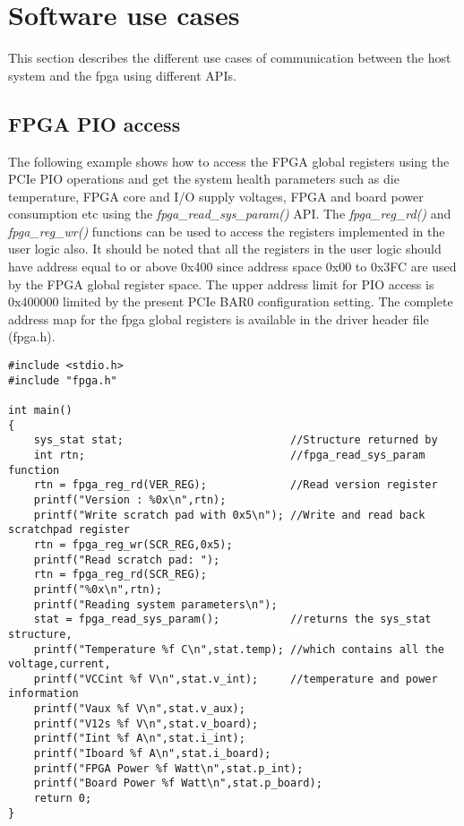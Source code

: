 \section{Software use cases}
This section describes the different use cases of communication between the host system and the fpga using different APIs. 

\subsection{FPGA PIO access}
The following example shows how to access the FPGA global registers using the PCIe PIO operations and get the system health parameters such as die temperature, FPGA core and I/O supply voltages, FPGA and board power consumption etc using the \emph{fpga\_read\_sys\_param()} API.
The \emph{fpga\_reg\_rd()} and \emph{fpga\_reg\_wr()} functions can be used to access the registers implemented in the user logic also.
It should be noted that all the registers in the user logic should have address equal to or above 0x400 since address space 0x00 to 0x3FC are used by the FPGA global register space.
The upper address limit for PIO access is 0x400000 limited by the present PCIe BAR0 configuration setting.
The complete address map for the fpga global registers is available in the driver header file (fpga.h).

\begin{verbatim}
#include <stdio.h>
#include "fpga.h"

int main() 
{
    sys_stat stat;                          //Structure returned by 
    int rtn;                                //fpga_read_sys_param function
    rtn = fpga_reg_rd(VER_REG);             //Read version register
    printf("Version : %0x\n",rtn);
    printf("Write scratch pad with 0x5\n"); //Write and read back scratchpad register
    rtn = fpga_reg_wr(SCR_REG,0x5);
    printf("Read scratch pad: ");
    rtn = fpga_reg_rd(SCR_REG);
    printf("%0x\n",rtn);   
    printf("Reading system parameters\n");
    stat = fpga_read_sys_param();           //returns the sys_stat structure,  
    printf("Temperature %f C\n",stat.temp); //which contains all the voltage,current,
    printf("VCCint %f V\n",stat.v_int);     //temperature and power information  
    printf("Vaux %f V\n",stat.v_aux);
    printf("V12s %f V\n",stat.v_board);
    printf("Iint %f A\n",stat.i_int);
    printf("Iboard %f A\n",stat.i_board);
    printf("FPGA Power %f Watt\n",stat.p_int);
    printf("Board Power %f Watt\n",stat.p_board);
    return 0;
}                 
\end{verbatim}


